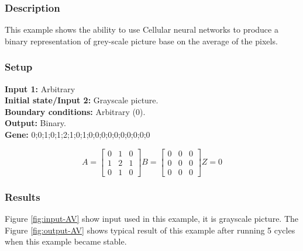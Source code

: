 \subsubsection{Description}
This example shows the ability to use Cellular neural networks to produce a binary representation of grey-scale picture base on the average of the pixels. 
\subsubsection{Setup}
\textbf{Input 1:} Arbitrary\\
\textbf{Initial state/Input 2:} Grayscale picture.\\
\textbf{Boundary conditions:} Arbitrary (0).\\
\textbf{Output:} Binary.\\
\textbf{Gene:} 0;0;1;0;1;2;1;0;1;0;0;0;0;0;0;0;0;0;0\\

\begin{minipage}{0.9\linewidth}
\begin{equation}
A =
\begin{bmatrix}
 0 & 1 & 0 \\
 1 & 2 & 1 \\
 0 & 1 & 0
\end{bmatrix}
B =
\begin{bmatrix}
 0 & 0 & 0 \\
 0 & 0 & 0 \\
 0 & 0 & 0
\end{bmatrix}
Z = 0
\end{equation}
\end{minipage}

\subsubsection{Results}
Figure \ref{fig:input-AV} show input used in this example, it is grayscale picture. The Figure \ref{fig:output-AV} shows typical result of this example after running 5 cycles when this example became stable. \\

